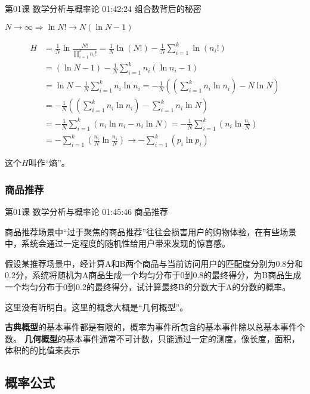 \documentclass[UTF8]{ctexbook}
\begin{document}
第01课 数学分析与概率论 01:42:24 组合数背后的秘密

$N \rightarrow \infty \Rightarrow \ln N! \rightarrow N(\ln N -1)$

\begin{equation}
\begin{aligned}
H&=\frac{1}{N} \ln \frac{N!}{\prod_{i=1}^{k}n_{i}!}=\frac{1}{N} \ln (N!) - \frac{1}{N} \sum_{i=1}^{k} \ln (n_{i}!) \\
&=(\ln N -1)-\frac{1}{N} \sum_{i=1}^{k} n_{i}(\ln n_{i}-1) \\
&=\ln N-\frac{1}{N} \sum_{i=1}^{k} n_{i}\ln n_{i}
=-\frac{1}{N} \left (  \left (  \sum_{i=1}^{k} n_{i}\ln n_{i}  \right ) - N\ln N\right ) \\
&= -\frac{1}{N} \left (  \left (  \sum_{i=1}^{k} n_{i}\ln n_{i}  \right ) - \sum_{i=1}^{k} n_{i} \ln N\right ) \\
&=-\frac{1}{N} \sum_{i=1}^{k} \left (  n_{i}\ln n_{i} - n_{i}\ln N  \right )
=-\frac{1}{N} \sum_{i=1}^{k} \left ( n_{i}\ln \frac{n_{i}}{N} \right ) \\
&=-\sum_{i=1}^{k} \left ( \frac{n_{i}}{N}  \ln \frac{n_{i}}{N} \right )
\rightarrow -\sum_{i=1}^{k} \left ( p_{i} \ln p_{i}  \right )
\end{aligned}
\end{equation}

这个$H$叫作“熵”。

\subsubsection{商品推荐}

第01课 数学分析与概率论 01:45:46 商品推荐

商品推荐场景中“过于聚焦的商品推荐”往往会损害用户的购物体验，在有些场景中，系统会通过一定程度的随机性给用户带来发现的惊喜感。

假设某推荐场景中，经计算A和B两个商品与当前访问用户的匹配度分别为0.8分和0.2分，系统将随机为A商品生成一个均匀分布于0到0.8的最终得分，为B商品生成一个均匀分布于0到0.2的最终得分，试计算最终B的分数大于A的分数的概率。

这里没有听明白。这里的概念大概是“几何概型”。

\textbf{古典概型}的基本事件都是有限的，概率为事件所包含的基本事件除以总基本事件个数。
\textbf{几何概型}的基本事件通常不可计数，只能通过一定的测度，像长度，面积，体积的的比值来表示


\subsection{概率公式}
\end{document}
